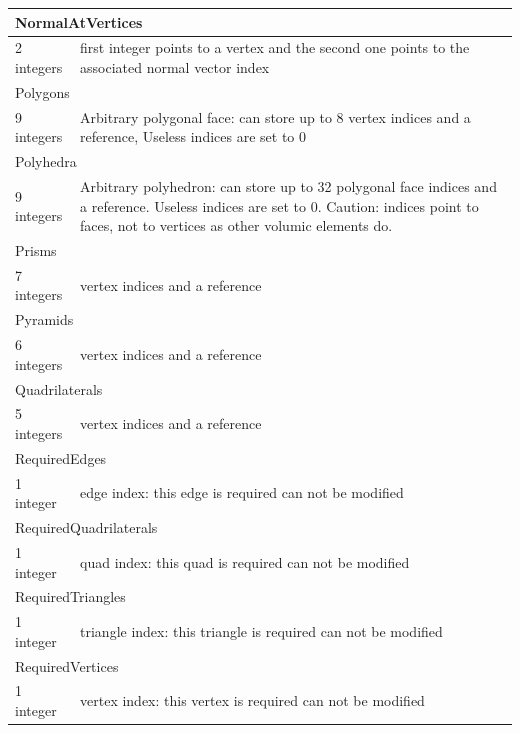 \documentclass[a4paper,12pt]{article}
\begin{document}
\begin{longtable}{|m{4cm}|m{11cm}|}
\multicolumn{2}{|l|}{NormalAtVertices} \\
\hline
2 integers & first integer points to a vertex and the second one points to the associated normal vector index \\
\hline\hline

\multicolumn{2}{|l|}{Polygons} \\
\hline
9 integers & Arbitrary polygonal face: can store up to 8 vertex indices and a reference, Useless indices are set to 0 \\
\hline\hline

\multicolumn{2}{|l|}{Polyhedra} \\
\hline
9 integers & Arbitrary polyhedron: can store up to 32 polygonal face indices and a reference. Useless indices are set to 0. Caution: indices point to faces, not to vertices as other volumic elements do. \\
\hline\hline

\multicolumn{2}{|l|}{Prisms} \\
\hline
7 integers & vertex indices and a reference \\
\hline\hline

\multicolumn{2}{|l|}{Pyramids} \\
\hline
6 integers & vertex indices and a reference \\
\hline\hline

\multicolumn{2}{|l|}{Quadrilaterals} \\
\hline
5 integers & vertex indices and a reference \\
\hline\hline

\multicolumn{2}{|l|}{RequiredEdges} \\
\hline
1 integer & edge index: this edge is required can not be modified \\
\hline\hline

\multicolumn{2}{|l|}{RequiredQuadrilaterals} \\
\hline
1 integer & quad index: this quad is required can not be modified \\
\hline\hline

\multicolumn{2}{|l|}{RequiredTriangles} \\
\hline
1 integer & triangle index: this triangle is required can not be modified \\
\hline\hline

\multicolumn{2}{|l|}{RequiredVertices} \\
\hline
1 integer & vertex index: this vertex is required can not be modified \\
\hline\hline


\end{longtable}
\end{document}
